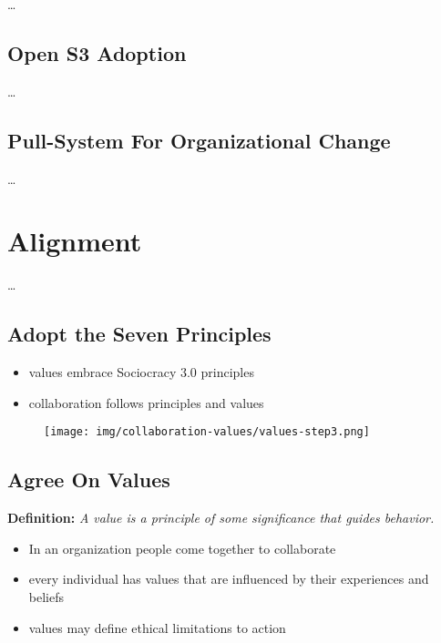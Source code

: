 {\ldots}

\section{Open S3 Adoption}
\label{opens3adoption}

{\ldots}

\section{Pull-System For Organizational Change}
\label{pull-systemfororganizationalchange}

{\ldots}

\chapter{Alignment}
\label{alignment}

{\ldots}

\section{Adopt the Seven Principles}
\label{adoptthesevenprinciples}

\begin{itemize}
\item values embrace Sociocracy 3.0 principles

\item collaboration follows principles and values

\end{itemize}

\begin{figure}[htbp]
\centering
\texttt{[image: img/collaboration-values/values-step3.png]}
\end{figure}

\section{Agree On Values}
\label{agreeonvalues}

\textbf{Definition:} \emph{A value is a principle of some significance that guides behavior.}

\begin{itemize}
\item In an organization people come together to collaborate

\item every individual has values that are influenced by their experiences and beliefs

\item values may define ethical limitations to action

\end{itemize}

